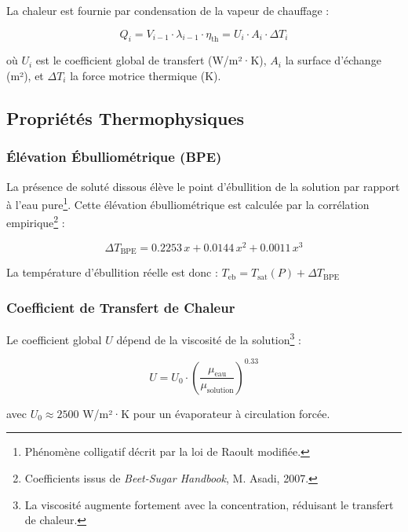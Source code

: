 \documentclass[12pt,a4paper,twoside]{article}
\begin{document}
La chaleur est fournie par condensation de la vapeur de chauffage :

\begin{equation}
Q_i = V_{i-1} \cdot \lambda_{i-1} \cdot \eta_{\text{th}} = U_i \cdot A_i \cdot \Delta T_i
\label{eq:heat_transfer}
\end{equation}

où $U_i$ est le coefficient global de transfert (W/m²·K), $A_i$ la surface d'échange (m²), et $\Delta T_i$ la force motrice thermique (K).

\subsection{Propriétés Thermophysiques}

\subsubsection{Élévation Ébulliométrique (BPE)}

La présence de soluté dissous élève le point d'ébullition de la solution par rapport à l'eau pure\footnote{Phénomène colligatif décrit par la loi de Raoult modifiée.}. Cette élévation ébulliométrique est calculée par la corrélation empirique\footnote{Coefficients issus de \textit{Beet-Sugar Handbook}, M. Asadi, 2007.} :

\begin{equation}
\boxed{\Delta T_{\text{BPE}} = 0.2253 \, x + 0.0144 \, x^2 + 0.0011 \, x^3}
\label{eq:bpe}
\end{equation}

La température d'ébullition réelle est donc : $T_{\text{eb}} = T_{\text{sat}}(P) + \Delta T_{\text{BPE}}$

\subsubsection{Coefficient de Transfert de Chaleur}

Le coefficient global $U$ dépend de la viscosité de la solution\footnote{La viscosité augmente fortement avec la concentration, réduisant le transfert de chaleur.} :

\begin{equation}
U = U_0 \cdot \left(\frac{\mu_{\text{eau}}}{\mu_{\text{solution}}}\right)^{0.33}
\label{eq:htc}
\end{equation}

avec $U_0 \approx 2500$ W/m²·K pour un évaporateur à circulation forcée.
\end{document}
